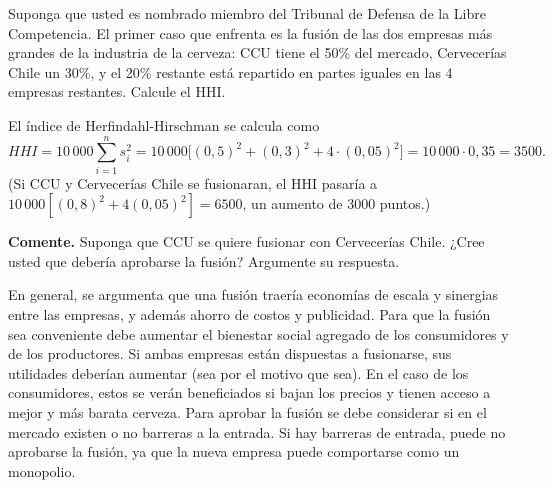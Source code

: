 \question Suponga que usted es nombrado miembro del Tribunal de Defensa de la Libre Competencia. El primer caso que enfrenta es la fusión de las dos empresas más grandes de la industria de la cerveza: CCU tiene el 50\% del mercado, Cervecerías Chile un 30\%, y el 20\% restante está repartido en partes iguales en las 4 empresas restantes. Calcule el HHI.
\begin{solution}
El índice de Herfindahl-Hirschman se calcula como
\[
  HHI = 10\,000\sum_{i=1}^{n}s_i^2 = 10\,000\bigl[(0{,}5)^2 + (0{,}3)^2 + 4\cdot(0{,}05)^2\bigr] = 10\,000\cdot 0{,}35 = 3500 .
\]
(Si CCU y Cervecerías Chile se fusionaran, el HHI pasaría a $10\,000[(0{,}8)^2 + 4(0{,}05)^2] = 6500$, un aumento de $3000$ puntos.)

\end{solution}

\question \textbf{Comente.} Suponga que CCU se quiere fusionar con Cervecerías Chile. ¿Cree usted que debería aprobarse la fusión? Argumente su respuesta.
\begin{solution}
En general, se argumenta que una fusión traería economías de escala y sinergias entre las empresas, y además ahorro de costos y publicidad. Para que la fusión sea conveniente debe aumentar el bienestar social agregado de los consumidores y de los productores. Si ambas empresas están dispuestas a fusionarse, sus utilidades deberían aumentar (sea por el motivo que sea). En el caso de los consumidores, estos se verán beneficiados si bajan los precios y tienen acceso a mejor y más barata cerveza. Para aprobar la fusión se debe considerar si en el mercado existen o no barreras a la entrada. Si hay barreras de entrada, puede no aprobarse la fusión, ya que la nueva empresa puede comportarse como un monopolio.

\end{solution}

